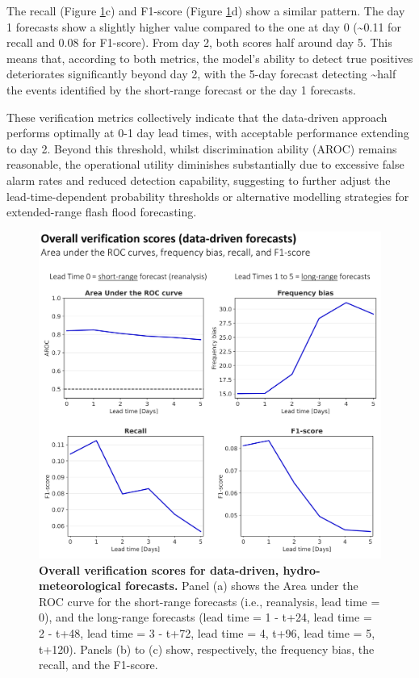 The recall (Figure \ref{fig:hydro_based_ff_verif_overall_scores}c) and F1-score (Figure \ref{fig:hydro_based_ff_verif_overall_scores}d) show a similar pattern. The day 1 forecasts show a slightly higher value compared to the one at day 0 (\sim 0.11 for recall and 0.08 for F1-score). From day 2, both scores half around day 5. This means that, according to both metrics, the model's ability to detect true positives deteriorates significantly beyond day 2, with the 5-day forecast detecting \sim half the events identified by the short-range forecast or the day 1 forecasts.

These verification metrics collectively indicate that the data-driven approach performs optimally at 0-1 day lead times, with acceptable performance extending to day 2. Beyond this threshold, whilst discrimination ability (AROC) remains reasonable, the operational utility diminishes substantially due to excessive false alarm rates and reduced detection capability, suggesting to further adjust the lead-time-dependent probability thresholds or alternative modelling strategies for extended-range flash flood forecasting.


\begin{figure}[htbp]
\centering
\includegraphics[width=\textwidth]{hydro_based_ff_verif_overall_scores.png}
\caption{\textbf{Overall verification scores for data-driven, hydro-meteorological forecasts.} Panel (a) shows the Area under the ROC curve for the short-range forecasts (i.e., reanalysis, lead time = 0), and the long-range forecasts (lead time = 1 - t+24, lead time = 2 - t+48, lead time = 3 - t+72, lead time = 4, t+96, lead time = 5, t+120). Panels (b) to (c) show, respectively, the frequency bias, the recall, and the F1-score.}
\label{fig:hydro_based_ff_verif_overall_scores}
\end{figure}


